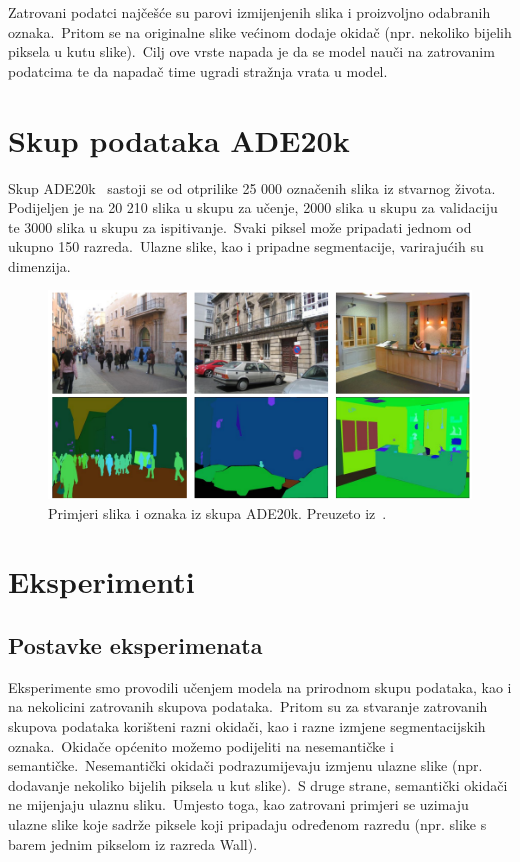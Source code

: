 \documentclass[times, utf8, seminar, numeric]{fer}
\begin{document}
Zatrovani podatci najčešće su parovi izmijenjenih slika i proizvoljno odabranih oznaka.\ Pritom se na originalne slike većinom dodaje okidač (npr. nekoliko bijelih piksela u kutu slike).\ Cilj ove vrste napada je da se model nauči na zatrovanim podatcima te da napadač time ugradi stražnja vrata u model.

\chapter{Skup podataka ADE20k}

Skup ADE20k~\cite{zhou2019semantic} sastoji se od otprilike 25 000 označenih slika iz stvarnog života. Podijeljen je na 20 210 slika u skupu za učenje, 2000 slika u skupu za validaciju te 3000 slika u skupu za ispitivanje.\ 
Svaki piksel može pripadati jednom od ukupno 150 razreda.\ Ulazne slike, kao i pripadne segmentacije, varirajućih su dimenzija.
  
\begin{figure}[htb]
    \centering
    \includegraphics[scale=1]{./Slike/ade20k.png}
    \caption{Primjeri slika i oznaka iz skupa ADE20k. Preuzeto iz~\cite{zhou2019semantic}.}
    \label{fig:ade20k}
\end{figure}
\chapter{Eksperimenti}

\section{Postavke eksperimenata}

Eksperimente smo provodili učenjem modela na prirodnom skupu podataka, kao i na nekolicini zatrovanih skupova podataka.\ Pritom su za stvaranje zatrovanih skupova podataka korišteni razni okidači, kao i razne izmjene segmentacijskih oznaka.\ 
Okidače općenito možemo podijeliti na nesemantičke i semantičke.\ Nesemantički okidači podrazumijevaju izmjenu ulazne slike (npr. dodavanje nekoliko bijelih piksela u kut slike).\ S druge strane, semantički okidači ne mijenjaju ulaznu sliku.\ 
Umjesto toga, kao zatrovani primjeri se uzimaju ulazne slike koje sadrže piksele koji pripadaju određenom razredu (npr. slike s barem jednim pikselom iz razreda Wall).
  
\end{document}
